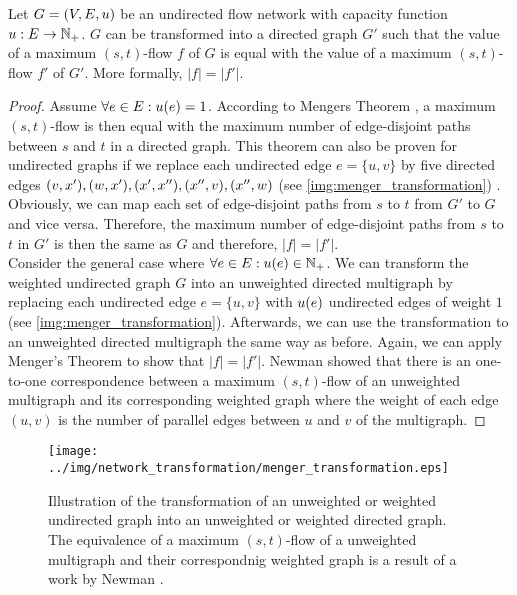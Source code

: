 \begin{lemma}
\label{lemma:undirected_transformation}
Let $G = (V,E,u)$ be an undirected flow network with capacity function $u: E \rightarrow \mathbb{N}_+$.
$G$ can be transformed into a directed graph $G'$ such that the value of a maximum $(s,t)$-flow $f$ of $G$
is equal with the value of a maximum $(s,t)$-flow $f'$ of $G'$. More formally, $|f| = |f'|$.
\end{lemma}

\begin{proof}
Assume $\forall e \in E: u(e) = 1$. According to Mengers Theorem \cite{menger1927allgemeinen},
a maximum $(s,t)$-flow is then equal with the maximum number of edge-disjoint paths between 
$s$ and $t$ in a directed graph.
This theorem can also be proven for undirected graphs if we replace each undirected edge
$e = \{u,v\}$ by five directed edges $(v,x'),(w,x'),(x',x''),(x'',v),(x'',w)$ (see \autoref{img:menger_transformation})
\cite{menger1927allgemeinen}. Obviously, we can map each set of edge-disjoint paths from $s$ to $t$ from $G'$ to $G$
and vice versa. Therefore, the maximum number of edge-disjoint paths from $s$ to $t$ in
$G'$ is then the same as $G$ and therefore, $|f| = |f'|$. \\
Consider the general case where $\forall e \in E: u(e) \in \mathbb{N}_+$. We can transform the
weighted undirected graph $G$ into an unweighted directed multigraph by replacing each undirected
edge $e = \{u,v\}$ with $u(e)$ undirected edges of weight $1$ (see \autoref{img:menger_transformation}).
Afterwards, we can use the transformation to an unweighted directed multigraph the same way as before.
Again, we can apply Menger's Theorem to show that $|f| = |f'|$. Newman \cite{newman2004analysis}
showed that there is an one-to-one correspondence between a maximum $(s,t)$-flow of an unweighted multigraph
and its corresponding weighted graph where the weight of each edge $(u,v)$ is the number of parallel
edges between $u$ and $v$ of the multigraph.
\end{proof}

\begin{figure}[h]
\centering
\texttt{[image: ../img/network\_transformation/menger\_transformation.eps]}
\caption{Illustration of the transformation of an unweighted or weighted undirected graph into
         an unweighted or weighted directed graph. The equivalence of a maximum $(s,t)$-flow
         of a unweighted multigraph and their correspondnig weighted graph is a result of 
         a work by Newman \cite{newman2004analysis}.}
\label{img:menger_transformation}
\end{figure}

